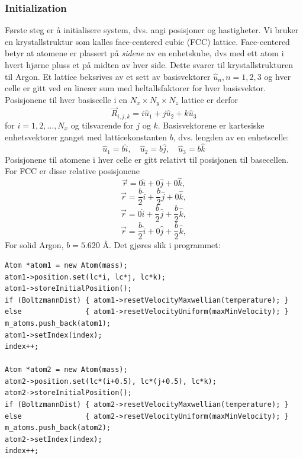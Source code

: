 \documentclass[english, a4paper]{article}
\begin{document}
\subsubsection{Initialization}
Første steg er å initialisere system, dvs. angi posisjoner og hastigheter.
Vi bruker en krystallstruktur som kalles face-centered cubic (FCC) lattice.
Face-centered betyr at atomene er plassert på \textit{sidene} av en enhetskube, dvs
med ett atom i hvert hjørne pluss et på midten av hver side.
Dette svarer til
krystallstrukturen til Argon. Et lattice beksrives av et sett av basisvektorer $\hat{u}_n, n = 1,2,3$
og hver celle er gitt ved en lineær sum med heltallsfaktorer for hver basisvektor. 
Posisjonene til hver basiscelle i en $N_x \times N_y \times N_z$ lattice er derfor
\begin{equation}
 \vec{R}_{i,j,k} = i\hat{u}_1 + j\hat{u}_2 + k\hat{u}_3
\end{equation}
for $i = 1,2,\dots,N_x$ og tilsvarende for $j$ og $k$. Basisvektorene er kartesiske enhetsvektorer
ganget med latticekonstanten $b$, dvs. lengden av en enhetscelle:
\begin{equation}
 \hat{u}_1 = b\hat{i}, \quad \hat{u}_2 = b\hat{j}, \quad \hat{u}_3 = b\hat{k}
\end{equation}
Posisjonene til atomene i hver celle er gitt relativt til posisjonen til basecellen. 
For FCC er disse relative posisjonene
\begin{equation}
 \vec{r} = 0\hat{i} + 0\hat{j} + 0\hat{k},
\end{equation}
\begin{equation}
 \vec{r} = \frac{b}{2}\hat{i} + \frac{b}{2}\hat{j} + 0\hat{k},
\end{equation}
\begin{equation}
 \vec{r} = 0\hat{i} + \frac{b}{2}\hat{j} + \frac{b}{2}\hat{k},
\end{equation}
\begin{equation}
 \vec{r} = \frac{b}{2}\hat{i} + 0\hat{j} + \frac{b}{2}\hat{k},
\end{equation}
For solid Argon, $b = 5.620$ Å. Det gjøres slik i programmet:
\begin{lstlisting}
Atom *atom1 = new Atom(mass);
atom1->position.set(lc*i, lc*j, lc*k);
atom1->storeInitialPosition();
if (BoltzmannDist) { atom1->resetVelocityMaxwellian(temperature); }
else               { atom1->resetVelocityUniform(maxMinVelocity); }
m_atoms.push_back(atom1);
atom1->setIndex(index);
index++;

Atom *atom2 = new Atom(mass);
atom2->position.set(lc*(i+0.5), lc*(j+0.5), lc*k);
atom2->storeInitialPosition();
if (BoltzmannDist) { atom2->resetVelocityMaxwellian(temperature); }
else               { atom2->resetVelocityUniform(maxMinVelocity); }
m_atoms.push_back(atom2);
atom2->setIndex(index);
index++;
\end{lstlisting}
\end{document}
